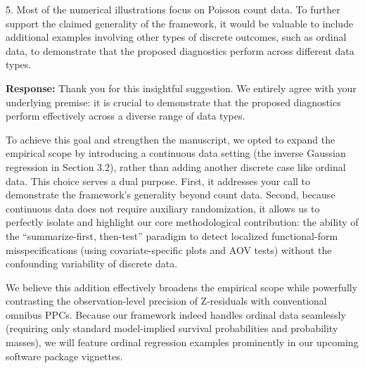 \documentclass[11pt]{article}
\newcommand*{\mybox}[2]{%
  \par\medskip\noindent
  \colorbox{#1!30}{\parbox{.98\linewidth}{#2}}%
  \par\medskip
}
\begin{document}
\medskip

\mybox{gray}{5. Most of the numerical illustrations focus on Poisson count data. To further support the claimed generality of the framework, it would be valuable to include additional examples involving other types of discrete outcomes, such as ordinal data, to demonstrate that the proposed diagnostics perform across different data types.}

\textbf{Response:}
Thank you for this insightful suggestion. We entirely agree with your underlying premise: it is crucial to demonstrate that the proposed diagnostics perform effectively across a diverse range of data types. 

To achieve this goal and strengthen the manuscript, we opted to expand the empirical scope by introducing a continuous data setting (the inverse Gaussian regression in Section 3.2), rather than adding another discrete case like ordinal data. This choice serves a dual purpose. First, it addresses your call to demonstrate the framework's generality beyond count data. Second, because continuous data does not require auxiliary randomization, it allows us to perfectly isolate and highlight our core methodological contribution: the ability of the ``summarize-first, then-test'' paradigm to detect localized functional-form misspecifications (using covariate-specific plots and AOV tests) without the confounding variability of discrete data.

We believe this addition effectively broadens the empirical scope while powerfully contrasting the observation-level precision of Z-residuals with conventional omnibus PPCs. Because our framework indeed handles ordinal data seamlessly (requiring only standard model-implied survival probabilities and probability masses), we will feature ordinal regression examples prominently in our upcoming software package vignettes.

\setlength{\bibsep}{0.2em}


\end{document}
